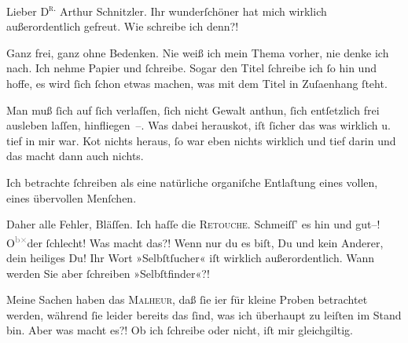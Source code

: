 \pstart{}{\pb}Lieber \textsc{D\textsuperscript{r.}} Arthur Schnitzler.\pend\vspace{0.5em}
\pstart
           Ihr wunderſchöner \label{K_L00351-1v}\label{K_L00351-1} hat mich wirklich
               außerordentlich gefreut. Wie schreibe ich denn?!\pend
           
\pstart
           Ganz frei, ganz ohne Bedenken. Nie weiß ich mein Thema vorher, nie denke ich nach.
               Ich nehme Papier und ſchreibe. Sogar den Titel ſchreibe ich ſo hin und hoffe, es wird
               ſich ſchon etwas machen, was mit dem Titel in Zuſa{\geminationm}enhang ſteht.\pend
           
\pstart
           Man muß ſich auf ſich verlaſſen, ſich nicht Gewalt anthun, ſich entſetzlich frei
               ausleben laſſen, hinfliegen –. {\pb}Was dabei herausko{\geminationm}t, iſt ſicher das was wirklich u. tief in mir war. Ko{\geminationm}t nichts heraus, ſo war eben nichts wirklich und tief
               darin und das macht dann auch nichts.\pend
           
\pstart
           Ich betrachte ſchreiben als eine natürliche organiſche Entlaſtung eines vollen, eines
               übervollen Menſchen.\pend
           
\pstart
           Daher alle \strikeout{\textcolor{gray}{meine}} Fehler, Bläſſen. Ich haſſe die \textsc{Retouche}. Schmeiſſ’
               es hin und gut–! O\substVorne{}\textsuperscript{\textcolor{gray}{b}\textcolor{gray}{×}}\substDazwischen{}de\substHinten{}r ſchlecht! Was macht das?! Wenn nur du es biſt, Du und kein Anderer, dein
               heiliges Du! Ihr Wort »Selbſtſucher« iſt wirklich {\pb}außerordentlich. Wann werden Sie aber ſchreiben »Selbſtfinder«?!\pend
           
\pstart
            Meine Sachen haben das \textsc{Malheur}, daß ſie i{\geminationm}er für
               kleine Proben betrachtet werden, während ſie leider bereits das ſind, was ich
               überhaupt zu leiſten im Stand bin. Aber was macht es?! Ob ich ſchreibe oder nicht,
               iſt mir gleichgiltig.\pend
           
